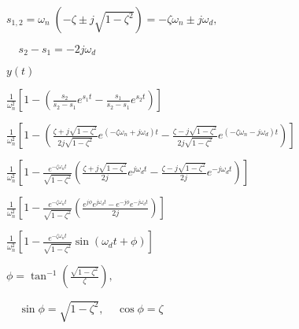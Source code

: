 \documentclass{article}
\def\lthtmlcheckvsize{\ifdim\ht\sizebox<\vsize 
  \ifdim\wd\sizebox<\hsize\expandafter\hfill\fi \expandafter\vfill
  \else\expandafter\vss\fi}%
\begin{document}
{\newpage\clearpage
{}%
$\displaystyle s_{1,2}=\omega_n \; (-\zeta\pm j\sqrt{1-\zeta^2})=-\zeta \omega_n\pm j\omega_d,
\;\;\;\;$%
\lthtmlindisplaymathZ
\lthtmlcheckvsize\clearpage}

{\newpage\clearpage
{}%
$\displaystyle \;\;\;\;s_2-s_1=-2j\omega_d$%
\lthtmlindisplaymathZ
\lthtmlcheckvsize\clearpage}

{\newpage\clearpage
{}%
$\displaystyle y(t)$%
\lthtmlindisplaymathZ
\lthtmlcheckvsize\clearpage}

{\newpage\clearpage
{}%
$\displaystyle \frac{1}{\omega_n^2}\left[1-\left(\frac{s_2}{s_2-s_1}e^{s_1t}-\frac{s_1}{s_2-s_1}e^{s_2t}\right)\right]$%
\lthtmlindisplaymathZ
\lthtmlcheckvsize\clearpage}

{\newpage\clearpage
{}%
$\displaystyle \frac{1}{\omega_n^2}\left[ 1-
\left(\frac{\zeta+j\sqrt{1-\zeta^2}}{2j\sqrt{1-\zeta^2}} e^{(-\zeta\omega_n+j\omega_d)t}
-\frac{\zeta-j\sqrt{1-\zeta^2}}{2j\sqrt{1-\zeta^2}} e^{(-\zeta\omega_n-j\omega_d)t} \right) \right]$%
\lthtmlindisplaymathZ
\lthtmlcheckvsize\clearpage}

{\newpage\clearpage
{}%
$\displaystyle \frac{1}{\omega_n^2}\left[ 1-\frac{e^{-\zeta\omega_nt}}{\sqrt{1-\zeta^2}}
\left(\frac{\zeta+j\sqrt{1-\zeta^2}}{2j} e^{ j\omega_dt}
-\frac{\zeta-j\sqrt{1-\zeta^2}}{2j} e^{-j\omega_dt} \right) \right]$%
\lthtmlindisplaymathZ
\lthtmlcheckvsize\clearpage}

{\newpage\clearpage
{}%
$\displaystyle \frac{1}{\omega_n^2}\left[ 1-\frac{e^{-\zeta\omega_nt}}{\sqrt{1-\zeta^2}}
\left(\frac{ e^{j\phi} e^{ j\omega_dt}-e^{-j\phi} e^{-j\omega_dt} }{2j} \right) \right]$%
\lthtmlindisplaymathZ
\lthtmlcheckvsize\clearpage}

{\newpage\clearpage
{}%
$\displaystyle \frac{1}{\omega_n^2}\left[1-\frac{e^{-\zeta\omega_nt}}{\sqrt{1-\zeta^2}}
\sin(\omega_dt+\phi) \right]$%
\lthtmlindisplaymathZ
\lthtmlcheckvsize\clearpage}

{\newpage\clearpage
{}%
$\displaystyle \phi=\tan^{-1}\left( \frac{\sqrt{1-\zeta^2}}{\zeta} \right),
\;\;\;\;$%
\lthtmlindisplaymathZ
\lthtmlcheckvsize\clearpage}

{\newpage\clearpage
{}%
$\displaystyle \;\;\;\;
\sin \phi=\sqrt{1-\zeta^2},\;\;\;\;\cos \phi=\zeta$%
\lthtmlindisplaymathZ
\lthtmlcheckvsize\clearpage}
\end{document}
